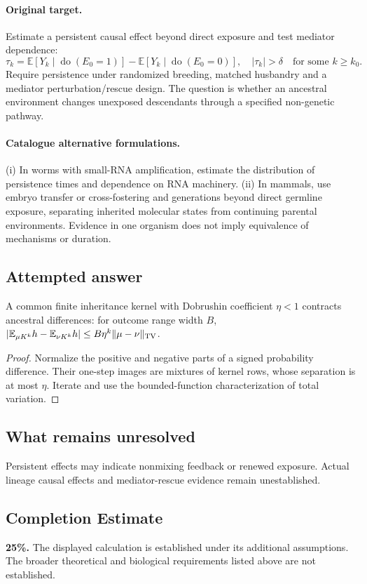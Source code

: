 \documentclass[11pt]{article}
\begin{document}
\paragraph{Original target.}
Estimate a persistent causal effect beyond direct exposure and test mediator dependence:
\[
\tau_k=\mathbb{E}[Y_k\mid\operatorname{do}(E_0=1)]-\mathbb{E}[Y_k\mid\operatorname{do}(E_0=0)],
\quad |\tau_k|>\delta\quad\text{for some }k\geq k_0.
\]
Require persistence under randomized breeding, matched husbandry and a mediator perturbation/rescue design. The question is whether an ancestral environment changes unexposed descendants through a specified non-genetic pathway.
\paragraph{Catalogue alternative formulations.}
(i) In worms with small-RNA amplification, estimate the distribution of persistence times and dependence on RNA machinery. (ii) In mammals, use embryo transfer or cross-fostering and generations beyond direct germline exposure, separating inherited molecular states from continuing parental environments. Evidence in one organism does not imply equivalence of mechanisms or duration.
\subsection{Attempted answer}
\begin{proposition}
A common finite inheritance kernel with Dobrushin coefficient $\eta<1$ contracts ancestral differences: for outcome range width $B$, $|\mathbb{E}_{\mu K^k}h-\mathbb{E}_{\nu K^k}h|\leq B\eta^k\|\mu-\nu\|_{\rm TV}$.
\end{proposition}
\begin{proof}
Normalize the positive and negative parts of a signed probability difference. Their one-step images are mixtures of kernel rows, whose separation is at most $\eta$. Iterate and use the bounded-function characterization of total variation.
\end{proof}
\subsection{What remains unresolved}
Persistent effects may indicate nonmixing feedback or renewed exposure. Actual lineage causal effects and mediator-rescue evidence remain unestablished.
\subsection{Completion Estimate}
\textbf{25\%.} The displayed calculation is established under its additional assumptions. The broader theoretical and biological requirements listed above are not established.
\end{document}
